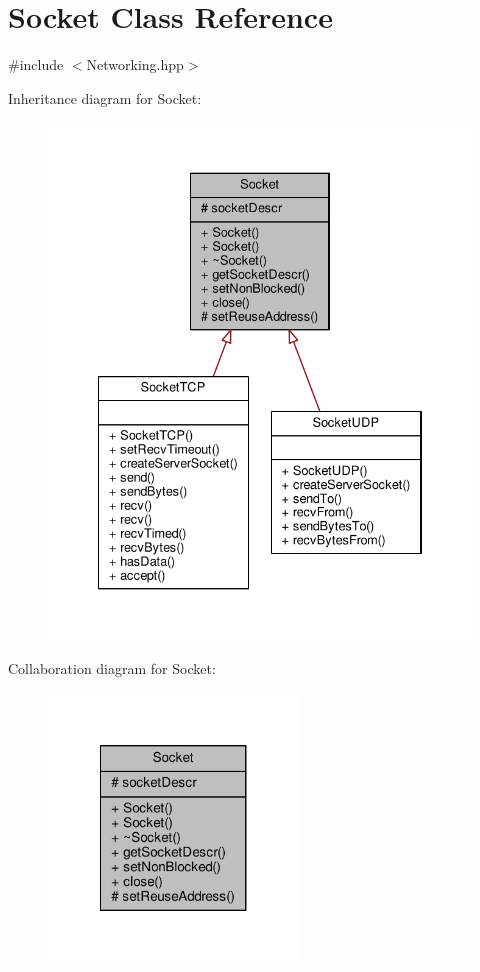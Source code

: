 \hypertarget{class_socket}{\section{Socket Class Reference}
\label{class_socket}
}


{\ttfamily \#include $<$Networking.\-hpp$>$}



Inheritance diagram for Socket\-:
\nopagebreak
\begin{figure}[H]
\begin{center}
\leavevmode
\includegraphics[width=334pt]{class_socket__inherit__graph}
\end{center}
\end{figure}


Collaboration diagram for Socket\-:
\nopagebreak
\begin{figure}[H]
\begin{center}
\leavevmode
\includegraphics[width=188pt]{class_socket__coll__graph}
\end{center}
\end{figure}
